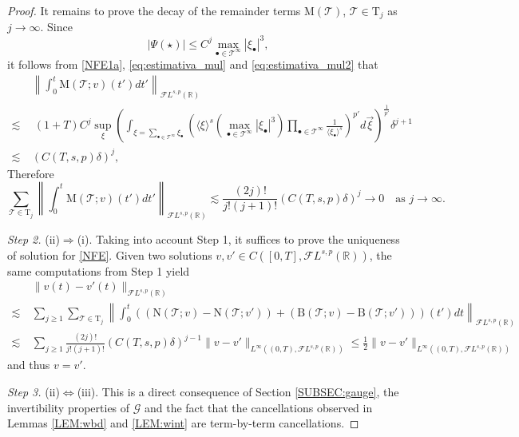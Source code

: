 \documentclass[%
11pt,  reqno]{amsart}
\newcommand{\jap}[1]{\langle #1 \rangle}
\newcommand{\5}{\textup{V}}
\newcommand{\noi}{\noindent}
\newcommand{\FL}{\mathcal{F} L}
\theoremstyle{remark}
\newcommand{\R}{\mathbb{R}}
\newcommand{\bul}{\bullet}
\newcommand{\TT}{\mathcal{T}}
\newcommand{\Tr}{\mathrm{T}}
\newcommand{\Gc}{\mathcal{G}}
\numberwithin{equation}{section}
\numberwithin{theorem}{section}
\newcommand{\MM}{\mathrm{M}}
\newcommand{\NN}{\mathrm{N}}
\newcommand{\BB}{\mathrm{B}}
\newcommand{\simao}[1]{\marginpar{\color{red} $\Leftarrow\Leftarrow\Leftarrow$}{\smallskip \noi\color{red}SIMAO: #1}\smallskip}
\begin{document}
\begin{proof}
It remains to prove the decay of the remainder terms $\MM(\TT)$, $\TT\in \Tr_j$ as $j\to \infty$. Since
$$
|\Psi(\star)|\le C^j\max_{\bul\in \TT^\infty} |\xi_\bul|^3,
$$
it follows from \eqref{NFE1a}, \eqref{eq:estimativa_mul} and \eqref{eq:estimativa_mul2} that
\begin{align}
    &\left\|\int_0^t\MM(\TT;v)(t')dt'\right\|_{\FL^{s,p}(\R)} \\\lesssim &\ (1+T)C^j\sup_\xi \left( \int_{\xi=\sum_{\bul\in\TT^\infty}\xi_\bul} \left(\jap{\xi}^{s}\left(\max_{\bul\in\TT^\infty}|\xi_\bul|^3\right)\prod_{{\bul\in \TT^\infty}} \frac{1}{\jap{\xi_\bul}^{s}}\right)^{p'} d\vec{\xi} \right)^{\frac{1}{p'}}\delta^{j+1}\\\lesssim\ &(C(T,s,p)\delta)^j,
\end{align}
Therefore
$$
\sum_{\TT\in \Tr_j}\left\|\int_0^t\MM(\TT;v)(t')dt'\right\|_{\FL^{s,p}(\R)} \lesssim \frac{(2j)!}{j!(j+1)!}(C(T,s,p)\delta)^j \to 0\quad \mbox{as }j\to\infty.
$$

\smallskip
\noi\textit{Step 2.} (ii)$\Rightarrow$(i). Taking into account Step 1, it suffices to prove the uniqueness of solution for \eqref{NFE}. Given two solutions $v, v'\in C([0,T], \FL^{s,p}(\R))$, the same computations from Step 1 yield
\begin{align*}
    &\|v(t)-v'(t)\|_{\FL^{s,p}(\R)}\\\lesssim\ & \sum_{j\ge 1} \sum_{\TT\in\Tr_j} \left\|\int_0^t((\NN(\TT;v)-\NN(\TT;v'))+(\BB(\TT;v)-\BB(\TT;v')))(t')dt\right\|_{\mathcal{F}L^{s,p}(\R)}\\\lesssim \ & \sum_{j\ge 1} \frac{(2j)!}{j!(j+1)!} (C(T,s,p)\delta)^{j-1}\|v-v'\|_{L^\infty((0,T),\FL^{s,p}(\R))} \le \frac{1}{2}\|v-v'\|_{L^\infty((0,T),\FL^{s,p}(\R))} 
\end{align*}
and thus $v=v'$.

\smallskip
\noi\textit{Step 3.} (ii)$\Leftrightarrow$(iii). This is a direct consequence of Section \ref{SUBSEC:gauge}, the invertibility properties of $\Gc$ and the fact that the cancellations observed in Lemmas \ref{LEM:wbd} and \ref{LEM:wint} are term-by-term cancellations.
\end{proof}
\end{document}
